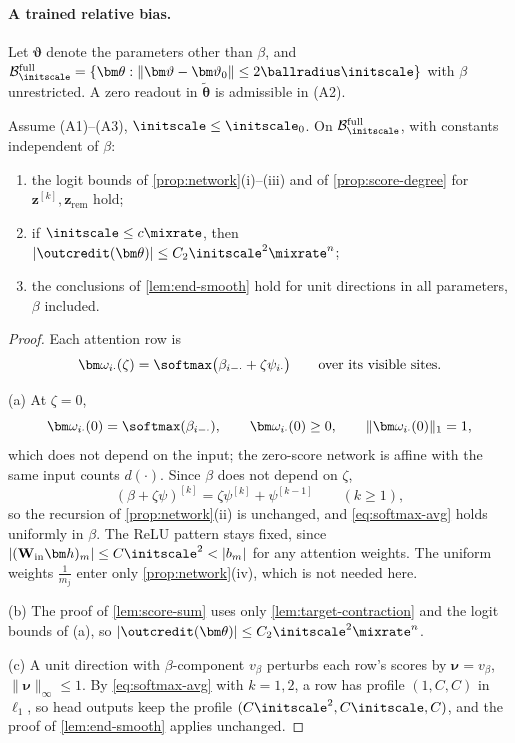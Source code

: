 \paragraph{A trained relative bias.} Let $\bm\vartheta$ denote the parameters other than $\beta$, and
$\mathcal B^{\mathrm{full}}_{\initscale}=\{\bm\theta:\|\bm\vartheta-\bm\vartheta_0\|\le2\ballradius\initscale\}$ with $\beta$ unrestricted. A zero readout in $\tilde{\bm\theta}$ is admissible in (A2).

\begin{lemma}
\label{lem:bias-uniform}
Assume (A1)--(A3), $\initscale\le\initscale_0$. On $\mathcal B^{\mathrm{full}}_{\initscale}$, with constants independent of $\beta$:
\begin{enumerate}[label=(\alph*),leftmargin=*,itemsep=1pt,topsep=2pt]
\item the logit bounds of \cref{prop:network}(i)--(iii) and of \cref{prop:score-degree} for $\bm z^{[k]},\bm z_{\mathrm{rem}}$ hold;
\item if $\initscale\le c\mixrate$, then $|\outcredit(\bm\theta)|\le C_2\initscale^2\mixrate^n$;
\item the conclusions of \cref{lem:end-smooth} hold for unit directions in all parameters, $\beta$ included.
\end{enumerate}
\end{lemma}

\begin{proof}
Each attention row is
\[
 \bm\omega_{i\cdot}(\zeta)=\softmax\bigl(\beta_{i-\cdot}+\zeta\psi_{i\cdot}\bigr)\qquad\text{over its visible sites.}
\]

\noindent(a) At $\zeta=0$,
\[
 \bm\omega_{i\cdot}(0)=\softmax(\beta_{i-\cdot}),\qquad \bm\omega_{i\cdot}(0)\ge0,\qquad \|\bm\omega_{i\cdot}(0)\|_1=1,
\]
which does not depend on the input; the zero-score network is affine with the same input counts $d(\cdot)$. Since $\beta$ does not
depend on $\zeta$,
\[
 (\beta+\zeta\psi)^{[k]}=\zeta\psi^{[k]}+\psi^{[k-1]}\qquad(k\ge1),
\]
so the recursion of \cref{prop:network}(ii) is unchanged, and \cref{eq:softmax-avg} holds uniformly in $\beta$. The ReLU pattern stays
fixed, since $|(\mathbf W_{\mathrm{in}}\bm h)_m|\le C\initscale^2<|b_m|$ for any attention weights. The uniform weights $\frac{1}{m_j}$ enter only
\cref{prop:network}(iv), which is not needed here.

\smallskip\noindent(b) The proof of \cref{lem:score-sum} uses only \cref{lem:target-contraction} and the logit bounds of (a), so
$|\outcredit(\bm\theta)|\le C_2\initscale^2\mixrate^n$.

\smallskip\noindent(c) A unit direction with $\beta$-component $v_\beta$ perturbs each row's scores by $\bm\nu=v_\beta$, $\|\bm\nu\|_\infty\le1$. By
\cref{eq:softmax-avg} with $k=1,2$, a row has profile $(1,C,C)$ in $\ell_1$, so head outputs keep the profile $(C\initscale^2,C\initscale,C)$, and the
proof of \cref{lem:end-smooth} applies unchanged.
\end{proof}


